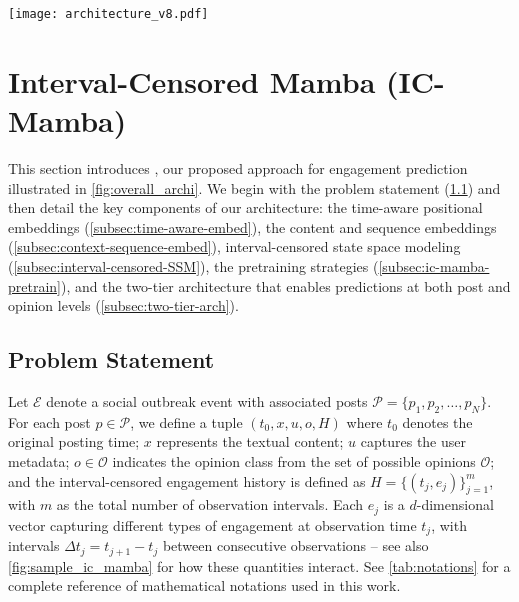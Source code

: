 
\begin{figure*}[tbp]
  \centering
  \texttt{[image: architecture\_v8.pdf]}
  \caption{
    Overview of the IC-Mamba Architecture for social media engagement prediction. 
    (left panel) The model first takes three types of inputs (interval-censored social engagement, post content, and user metadata). 
    These inputs are tokenized through a linear tokenization layer. 
    The tokenized sequence (combination of temporal embedding, positional embeddings and user embeddings) is processed through N-stacked \icmamba blocks.
    (right panel) Each \icmamba block contains a selective SSM mechanism and parallel Conv1d operations to handle input and time-interval vectors simultaneously. 
    Lastly, the processed features go through normalization and linear layers to generate the final social engagement predictions.
  }
  \label{fig:overall_archi}
\end{figure*}

\section{Interval-Censored Mamba (IC-Mamba)}
\label{sec: ic-mamba-method} 

This section introduces \icmamba, our proposed approach for engagement prediction illustrated in \cref{fig:overall_archi}.
We begin with the problem statement (\cref{subsec:problem-statement}) and then detail the key components of our architecture:
the time-aware positional embeddings (\cref{subsec:time-aware-embed}), 
the content and sequence embeddings (\cref{subsec:context-sequence-embed}), 
interval-censored state space modeling (\cref{subsec:interval-censored-SSM}), 
the pretraining strategies (\cref{subsec:ic-mamba-pretrain}), and 
the two-tier architecture that enables predictions at both post and opinion levels (\cref{subsec:two-tier-arch}).

\subsection{Problem Statement}
\label{subsec:problem-statement}
Let $\mathcal{E}$ denote a social outbreak event with associated posts $\mathcal{P} = \{p_1, p_2, \dots, p_N\}$. For each post $p \in \mathcal{P}$, we define a tuple $(t_0, x, u, o, H)$ where $t_0$ denotes the original posting time; $x$ represents the textual content; $u$ captures the user metadata; $o \in \mathcal{O}$ indicates the opinion class from the set of possible opinions $\mathcal{O}$; and the interval-censored engagement history is defined as $H = \{(t_j, e_j)\}_{j=1}^{m}$, with 
$m$ as the total number of observation intervals. Each $e_j$ is a $d$-dimensional vector capturing different types of engagement at observation time $t_j$, with intervals $\Delta t_j = t_{j+1} - t_j$ between consecutive observations -- see also \cref{fig:sample_ic_mamba} for how these quantities interact.
See \cref{tab:notations} for a complete reference of mathematical notations used in this work.


